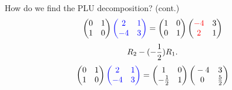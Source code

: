 \documentclass{beamer}
\begin{document}
\begin{frame}{How do we find the PLU decomposition? (cont.)}
    \pause
    \[
        \begin{pmatrix}{}
            0 & 1 \\
            1 & 0 \\
            \end{pmatrix}\textcolor{blue}{\begin{pmatrix}{}
            2 & 1 \\
            -4 & 3 \\
        \end{pmatrix}}
        =\begin{pmatrix}{}
            1 & 0 \\
            0 & 1 \\
        \end{pmatrix}
        \begin{pmatrix}{}
            \textcolor{red}{-4} & 3 \\
            \textcolor{red}{2} & 1 \\
        \end{pmatrix}
    \]
    \pause
    \[
    \small{R_2-(-\frac{1}{2})R_1.} 
    \]
    \[
        \begin{pmatrix}{}
            0 & 1 \\
            1 & 0 \\
            \end{pmatrix}\textcolor{blue}{\begin{pmatrix}{}
            2 & 1 \\
            -4 & 3 \\
        \end{pmatrix}}
        =\begin{pmatrix}{}
            1 & 0 \\
            -\frac{1}{2} & 1 \\
        \end{pmatrix}
        \begin{pmatrix}{}
            -4 & 3 \\
            0 & \frac{5}{2} \\
        \end{pmatrix}
    \]

\end{frame}
\end{document}

